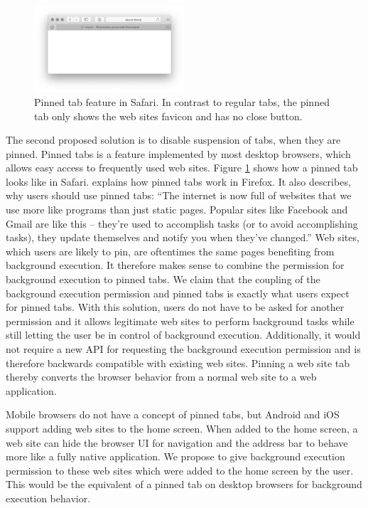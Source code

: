 \documentclass[
	ruledheaders=section,%
	class=report,%
	thesis={type=bachelor},%
	accentcolor=9c,%
	custommargins=true,%
	marginpar=false,%
	parskip=half-,%
	fontsize=11pt,%
]{tudapub}
\begin{document}
  \begin{figure}
    \centering
    \includegraphics[width=0.5\textwidth]{images/pinned-tab.png}
    \caption{Pinned tab feature in Safari. In contrast to regular tabs, the pinned tab only shows the web sites favicon and has no close button.}
    \label{fig:pinned-tab}
  \end{figure}
  
  The second proposed solution is to disable suspension of tabs, when they are pinned. Pinned tabs is a feature implemented by most desktop browsers, which allows easy access to frequently used web sites. Figure \ref{fig:pinned-tab} shows how a pinned tab looks like in Safari. \cite{firefox-pinned-tabs} explains how pinned tabs work in Firefox. It also describes, why users should use pinned tabs: ``The internet is now full of websites that we use more like programs than just static pages. Popular sites like Facebook and Gmail are like this – they're used to accomplish tasks (or to avoid accomplishing tasks), they update themselves and notify you when they've changed.'' Web sites, which users are likely to pin, are oftentimes the same pages benefiting from background execution. It therefore makes sense to combine the permission for background execution to pinned tabs. We claim that the coupling of the background execution permission and pinned tabs is exactly what users expect for pinned tabs. With this solution, users do not have to be asked for another permission and it allows legitimate web sites to perform background tasks while still letting the user be in control of background execution. Additionally, it would not require a new API for requesting the background execution permission and is therefore backwards compatible with existing web sites. Pinning a web site tab thereby converts the browser behavior from a normal web site to a web application.

  Mobile browsers do not have a concept of pinned tabs, but Android and iOS support adding web sites to the home screen. When added to the home screen, a web site can hide the browser UI for navigation and the address bar to behave more like a fully native application. We propose to give background execution permission to these web sites which were added to the home screen by the user. This would be the equivalent of a pinned tab on desktop browsers for background execution behavior.
  
  
  \newpage
  \printbibliography[heading=bibnumbered]


  \affidavit
\end{document}
